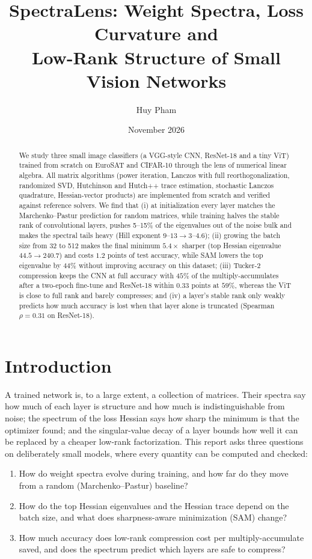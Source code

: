 \documentclass[11pt]{article}
\title{SpectraLens: Weight Spectra, Loss Curvature and\\ Low-Rank Structure of Small Vision Networks}
\author{Huy Pham}
\date{November 2026}
\theoremstyle{definition}
\begin{document}
\maketitle

\begin{abstract}
We study three small image classifiers (a VGG-style CNN, ResNet-18 and a tiny ViT) trained from
scratch on EuroSAT and CIFAR-10 through the lens of numerical linear algebra. All matrix
algorithms (power iteration, Lanczos with full reorthogonalization, randomized SVD, Hutchinson
and Hutch++ trace estimation, stochastic Lanczos quadrature, Hessian-vector products) are
implemented from scratch and verified against reference solvers. We find that (i) at
initialization every layer matches the Marchenko--Pastur prediction for random matrices, while
training halves the stable rank of convolutional layers, pushes 5--15\% of the eigenvalues out of
the noise bulk and makes the spectral tails heavy (Hill exponent $9$--$13 \to 3$--$4.6$); (ii)
growing the batch size from 32 to 512 makes the final minimum $5.4\times$ sharper (top Hessian
eigenvalue $44.5 \to 240.7$) and costs $1.2$ points of test accuracy, while SAM lowers the top
eigenvalue by $44\%$ without improving accuracy on this dataset; (iii) Tucker-2 compression keeps
the CNN at full accuracy with $45\%$ of the multiply-accumulates after a two-epoch fine-tune and
ResNet-18 within $0.33$ points at $59\%$, whereas the ViT is close to full rank and barely
compresses; and (iv) a layer's stable rank only weakly predicts how much accuracy is lost when
that layer alone is truncated (Spearman $\rho = 0.31$ on ResNet-18).
\end{abstract}

\section{Introduction}

A trained network is, to a large extent, a collection of matrices. Their spectra say how much of
each layer is structure and how much is indistinguishable from noise; the spectrum of the loss
Hessian says how sharp the minimum is that the optimizer found; and the singular-value decay of a
layer bounds how well it can be replaced by a cheaper low-rank factorization. This report asks
three questions on deliberately small models, where every quantity can be computed and checked:

\begin{enumerate}
  \item How do weight spectra evolve during training, and how far do they move from a random
        (Marchenko--Pastur) baseline?
  \item How do the top Hessian eigenvalues and the Hessian trace depend on the batch size, and
        what does sharpness-aware minimization (SAM) change?
  \item How much accuracy does low-rank compression cost per multiply-accumulate saved, and does
        the spectrum predict which layers are safe to compress?
\end{enumerate}
\end{document}
